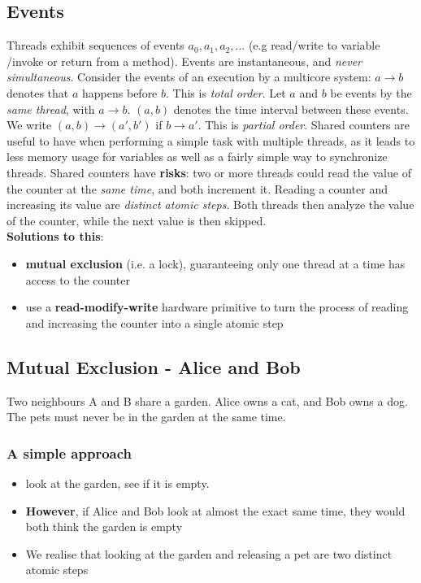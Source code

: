 \documentclass{article}
\begin{document}
\subsection{Events}
Threads exhibit sequences of events $a_0, a_1, a_2,...$ (e.g read/write to variable /invoke or return from a method).
\bigbreak Events are instantaneous, and \textit{never simultaneous}.
\bigbreak Consider the events of an execution by a multicore system:
$a\rightarrow b$ denotes that $a$ happens before $b$. This is \textit{total order}.
\bigbreak Let $a$ and $b$ be events by the \textit{same thread}, with $a \rightarrow b$.
\bigbreak$(a,b)$ denotes the time interval between these events.
\\We write $(a,b) \rightarrow (a',b')$ if $b \rightarrow a'$. This is \textit{partial order}.
\bigbreak Shared counters are useful to have when performing a simple task with multiple threads, as it leads to less memory usage for variables as well as a fairly simple way to synchronize threads. Shared counters have \textbf{risks}: two or more threads could read the value of the counter at the \textit{same time}, and both increment it. Reading a counter and increasing its value are \textit{distinct atomic steps}. Both threads then analyze the value of the counter, while the next value is then skipped.
\\\textbf{Solutions to this}:
\begin{itemize}
    \item \textbf{mutual exclusion} (i.e. a lock), guaranteeing only one thread at a time has access to the counter
    \item use a \textbf{read-modify-write} hardware primitive to turn the process of reading and increasing the counter into a single atomic step
\end{itemize}
\subsection{Mutual Exclusion - Alice and Bob}
Two neighbours A and B share a garden. Alice owns a cat, and Bob owns a dog. The pets must never be in the garden at the same time.
\subsubsection{A simple approach}
\begin{itemize}
    \item look at the garden, see if it is empty.
    \item \textbf{However}, if Alice and Bob look at almost the exact same time, they would both think the garden is empty
    \item We realise that looking at the garden and releasing a pet are two distinct atomic steps
\end{itemize}
\end{document}
